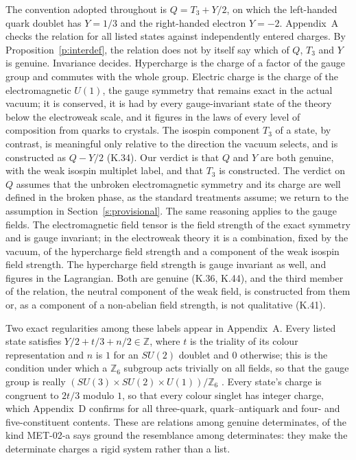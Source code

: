 \documentclass{situationist-preprint}
\begin{document}
The convention adopted throughout is $Q = T_3 + Y/2$, on which the left-handed quark doublet has $Y = 1/3$ and the right-handed electron $Y = -2$. Appendix~A checks the relation for all \vvNQcheck{} listed states against independently entered charges. By Proposition~\ref{p:interdef}, the relation does not by itself say which of $Q$, $T_3$ and $Y$ is genuine. Invariance decides. Hypercharge is the charge of a factor of the gauge group and commutes with the whole group. Electric charge is the charge of the electromagnetic $U(1)$, the gauge symmetry that remains exact in the actual vacuum; it is conserved, it is had by every gauge-invariant state of the theory below the electroweak scale, and it figures in the laws of every level of composition from quarks to crystals. The isospin component $T_3$ of a state, by contrast, is meaningful only relative to the direction the vacuum selects, and is constructed as $Q - Y/2$ (K.34). Our verdict is that $Q$ and $Y$ are both genuine, with the weak isospin multiplet label, and that $T_3$ is constructed. The verdict on $Q$ assumes that the unbroken electromagnetic symmetry and its charge are well defined in the broken phase, as the standard treatments assume; we return to the assumption in Section~\ref{s:provisional}. The same reasoning applies to the gauge fields. The electromagnetic field tensor is the field strength of the exact symmetry and is gauge invariant; in the electroweak theory it is a combination, fixed by the vacuum, of the hypercharge field strength and a component of the weak isospin field strength. The hypercharge field strength is gauge invariant as well, and figures in the Lagrangian. Both are genuine (K.36, K.44), and the third member of the relation, the neutral component of the weak field, is constructed from them or, as a component of a non-abelian field strength, is not qualitative (K.41).

Two exact regularities among these labels appear in Appendix~A. Every listed state satisfies $Y/2 + t/3 + n/2 \in \mathbb{Z}$, where $t$ is the triality of its colour representation and $n$ is $1$ for an $SU(2)$ doublet and $0$ otherwise; this is the condition under which a $\mathbb{Z}_6$ subgroup acts trivially on all fields, so that the gauge group is really $(SU(3)\times SU(2)\times U(1))/\mathbb{Z}_6$ \citep{BaezHuerta2010}. Every state's charge is congruent to $2t/3$ modulo $1$, so that every colour singlet has integer charge, which Appendix~D confirms for all \vvNDbaryons{} three-quark, \vvNDmesons{} quark--antiquark and \vvNDtwo{} four- and five-constituent contents. These are relations among genuine determinates, of the kind MET-02-a says ground the resemblance among determinates: they make the determinate charges a rigid system rather than a list.
\end{document}
